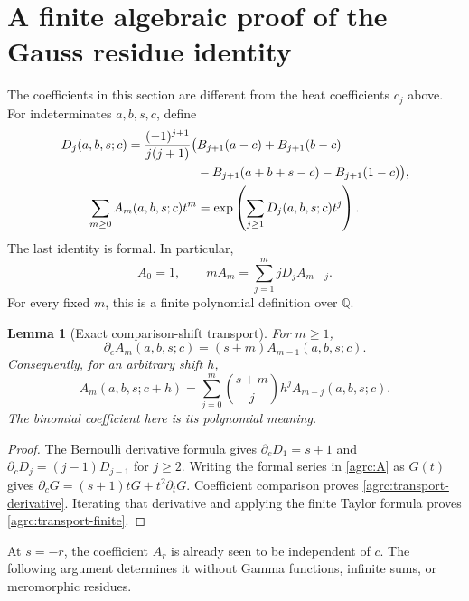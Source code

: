 \documentclass[11pt]{article}
\numberwithin{equation}{section}
\newtheorem{lemma}[theorem]{Lemma}
\theoremstyle{definition}\newtheorem{definition}[theorem]{Definition}
\theoremstyle{remark}\newtheorem{remark}[theorem]{Remark}
\newcommand{\Q}{\mathbb Q}
\begin{document}
\section{A finite algebraic proof of the Gauss residue identity}
\label{agrc:gauss-residue-section}

The coefficients in this section are different from the heat coefficients
$c_j$ above. For indeterminates $a,b,s,c$, define
\begin{align}
 D_j(a,b,s;c)=\frac{(-1)^{j+1}}{j(j+1)}
 \bigl(&B_{j+1}(a-c)+B_{j+1}(b-c)\notag\\
       &-B_{j+1}(a+b+s-c)-B_{j+1}(1-c)\bigr),\label{agrc:D}\\
 \sum_{m\geq0}A_m(a,b,s;c)t^m
 &=\exp\left(\sum_{j\geq1}D_j(a,b,s;c)t^j\right).
 \label{agrc:A}
\end{align}
The last identity is formal. In particular,
\begin{equation}\label{agrc:A-rec}
 A_0=1,\qquad mA_m=\sum_{j=1}^m jD_j A_{m-j}.
\end{equation}
For every fixed $m$, this is a finite polynomial definition over $\Q$.

\begin{lemma}[Exact comparison-shift transport]
\label{agrc:transport}
For $m\geq1$,
\begin{equation}\label{agrc:transport-derivative}
 \partial_c A_m(a,b,s;c)=(s+m)A_{m-1}(a,b,s;c).
\end{equation}
Consequently, for an arbitrary shift $h$,
\begin{equation}\label{agrc:transport-finite}
 A_m(a,b,s;c+h)=\sum_{j=0}^{m}
        \binom{s+m}{j}h^j A_{m-j}(a,b,s;c).
\end{equation}
The binomial coefficient here is its polynomial meaning.
\end{lemma}
\begin{proof}
The Bernoulli derivative formula gives
$\partial_cD_1=s+1$ and
$\partial_cD_j=(j-1)D_{j-1}$ for $j\geq2$.
Writing the formal series in \eqref{agrc:A} as $G(t)$ gives
$\partial_cG=(s+1)tG+t^2\partial_tG$. Coefficient comparison proves
\eqref{agrc:transport-derivative}. Iterating that derivative and applying
the finite Taylor formula proves \eqref{agrc:transport-finite}.
\end{proof}

At $s=-r$, the coefficient $A_r$ is already seen to be independent of $c$.
The following argument determines it without Gamma functions, infinite
sums, or meromorphic residues.
\end{document}
